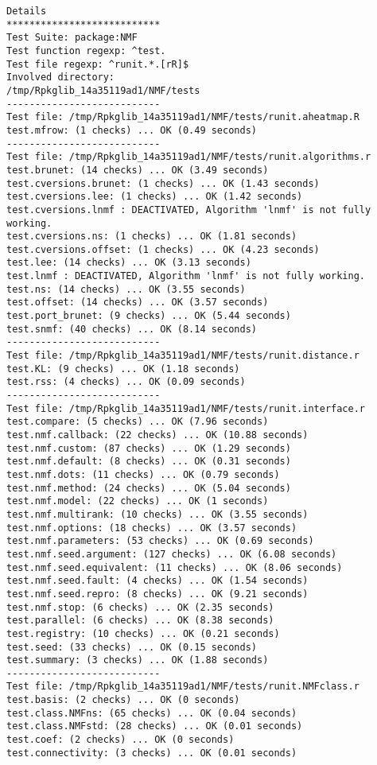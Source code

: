 \documentclass[10pt]{article}
\begin{document}
\begin{verbatim}
Details 
*************************** 
Test Suite: package:NMF 
Test function regexp: ^test. 
Test file regexp: ^runit.*.[rR]$ 
Involved directory: 
/tmp/Rpkglib_14a35119ad1/NMF/tests 
--------------------------- 
Test file: /tmp/Rpkglib_14a35119ad1/NMF/tests/runit.aheatmap.R 
test.mfrow: (1 checks) ... OK (0.49 seconds)
--------------------------- 
Test file: /tmp/Rpkglib_14a35119ad1/NMF/tests/runit.algorithms.r 
test.brunet: (14 checks) ... OK (3.49 seconds)
test.cversions.brunet: (1 checks) ... OK (1.43 seconds)
test.cversions.lee: (1 checks) ... OK (1.42 seconds)
test.cversions.lnmf : DEACTIVATED, Algorithm 'lnmf' is not fully working.
test.cversions.ns: (1 checks) ... OK (1.81 seconds)
test.cversions.offset: (1 checks) ... OK (4.23 seconds)
test.lee: (14 checks) ... OK (3.13 seconds)
test.lnmf : DEACTIVATED, Algorithm 'lnmf' is not fully working.
test.ns: (14 checks) ... OK (3.55 seconds)
test.offset: (14 checks) ... OK (3.57 seconds)
test.port_brunet: (9 checks) ... OK (5.44 seconds)
test.snmf: (40 checks) ... OK (8.14 seconds)
--------------------------- 
Test file: /tmp/Rpkglib_14a35119ad1/NMF/tests/runit.distance.r 
test.KL: (9 checks) ... OK (1.18 seconds)
test.rss: (4 checks) ... OK (0.09 seconds)
--------------------------- 
Test file: /tmp/Rpkglib_14a35119ad1/NMF/tests/runit.interface.r 
test.compare: (5 checks) ... OK (7.96 seconds)
test.nmf.callback: (22 checks) ... OK (10.88 seconds)
test.nmf.custom: (87 checks) ... OK (1.29 seconds)
test.nmf.default: (8 checks) ... OK (0.31 seconds)
test.nmf.dots: (11 checks) ... OK (0.79 seconds)
test.nmf.method: (24 checks) ... OK (5.04 seconds)
test.nmf.model: (22 checks) ... OK (1 seconds)
test.nmf.multirank: (10 checks) ... OK (3.55 seconds)
test.nmf.options: (18 checks) ... OK (3.57 seconds)
test.nmf.parameters: (53 checks) ... OK (0.69 seconds)
test.nmf.seed.argument: (127 checks) ... OK (6.08 seconds)
test.nmf.seed.equivalent: (11 checks) ... OK (8.06 seconds)
test.nmf.seed.fault: (4 checks) ... OK (1.54 seconds)
test.nmf.seed.repro: (8 checks) ... OK (9.21 seconds)
test.nmf.stop: (6 checks) ... OK (2.35 seconds)
test.parallel: (6 checks) ... OK (8.38 seconds)
test.registry: (10 checks) ... OK (0.21 seconds)
test.seed: (33 checks) ... OK (0.15 seconds)
test.summary: (3 checks) ... OK (1.88 seconds)
--------------------------- 
Test file: /tmp/Rpkglib_14a35119ad1/NMF/tests/runit.NMFclass.r 
test.basis: (2 checks) ... OK (0 seconds)
test.class.NMFns: (65 checks) ... OK (0.04 seconds)
test.class.NMFstd: (28 checks) ... OK (0.01 seconds)
test.coef: (2 checks) ... OK (0 seconds)
test.connectivity: (3 checks) ... OK (0.01 seconds)

\end{verbatim}
\end{document}
